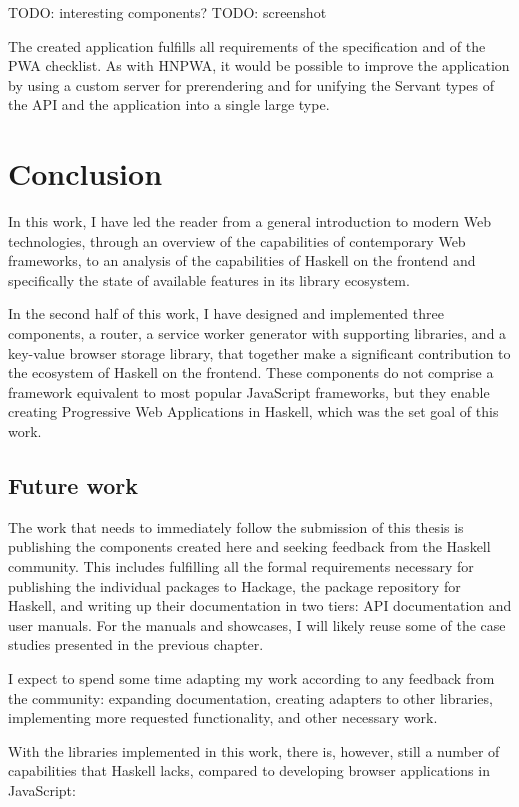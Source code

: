\documentclass[english,odsaz]{fitthesis}
\begin{document}
TODO: interesting components?
TODO: screenshot

The created application fulfills all requirements of the specification and of
the PWA checklist. As with HNPWA, it would be possible to improve the
application by using a custom server for prerendering and for unifying the
Servant types of the API and the application into a single large type.

\chapter{Conclusion}
\label{sec:org9e109d9}
In this work, I have led the reader from a general introduction to modern Web
technologies, through an overview of the capabilities of contemporary Web
frameworks, to an analysis of the capabilities of Haskell on the frontend and
specifically the state of available features in its library ecosystem.

In the second half of this work, I have designed and implemented three
components, a router, a service worker generator with supporting libraries, and
a key-value browser storage library, that together make a significant
contribution to the ecosystem of Haskell on the frontend. These components do not
comprise a framework equivalent to most popular JavaScript frameworks, but they
enable creating Progressive Web Applications in Haskell, which was the set goal
of this work.

\section{Future work}
\label{sec:orgc0c7da4}
The work that needs to immediately follow the submission of this thesis is
publishing the components created here and seeking feedback from the Haskell
community. This includes fulfilling all the formal requirements necessary for
publishing the individual packages to Hackage, the package repository for
Haskell, and writing up their documentation in two tiers: API documentation and
user manuals. For the manuals and showcases, I will likely reuse some of the
case studies presented in the previous chapter.

I expect to spend some time adapting my work according to any feedback from the
community: expanding documentation, creating adapters to other libraries,
implementing more requested functionality, and other necessary work.

With the libraries implemented in this work, there is, however, still a number of
capabilities that Haskell lacks, compared to developing browser applications in
JavaScript:
\end{document}
